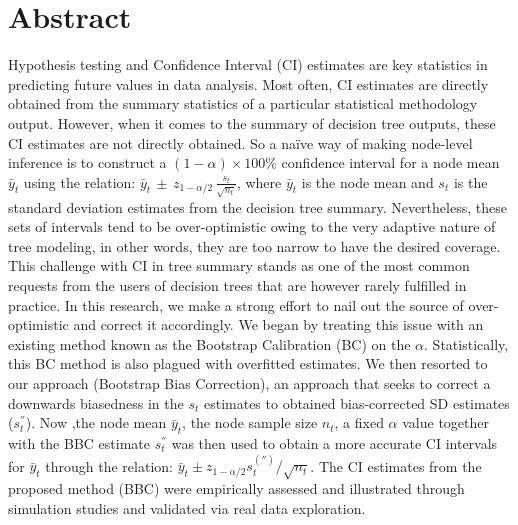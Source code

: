 

\chapter*{Abstract}

Hypothesis testing and Confidence Interval (CI) estimates are key statistics in predicting future values in data analysis. Most often, CI estimates are directly obtained from the summary statistics of a particular statistical methodology output. However, when it comes to the summary of decision tree outputs, these CI estimates are not directly obtained. So a na\"{i}ve way of making node-level inference is to construct a $(1-\alpha) \times 100\%$ confidence interval for a node mean $\bar{y}_t$ using the relation: $\bar{y}_t \, \pm  \, z_{1-\alpha/2} \, \frac{s_t}{\sqrt{n_t}}$, where $\bar{y}_t$ is the node mean and $s_t$ is the standard deviation estimates from the decision tree summary. Nevertheless, these sets of intervals tend to be over-optimistic owing to the very adaptive nature of tree modeling, in other words, they are too narrow to have the desired coverage. This challenge with CI in tree summary stands as one of the most common requests from the users of decision trees that are however rarely fulfilled in practice. In this research, we make a strong effort to nail out the source of over-optimistic and correct it accordingly. We began by treating this issue with an existing method known as the Bootstrap Calibration (BC) on the $\alpha$. Statistically, this BC method is also plagued with overfitted estimates. We then resorted to our approach (Bootstrap Bias Correction), an approach that seeks to correct a downwards biasedness in the $s_t$ estimates to obtained bias-corrected SD estimates ($s_t^{''}$). Now ,the node mean $\bar{y}_t$, the node sample size $n_t$,  a fixed $\alpha$ value together with the BBC estimate $s_t^{''}$ was then used to obtain a more accurate CI intervals for $\bar{y}_t$ through the relation: $\bar{y}_t \pm z_{1-\alpha/2} s^{('')}_t /\sqrt{n_t}$. The CI estimates from the proposed method (BBC) were empirically assessed and illustrated through simulation studies and validated via real data exploration.





